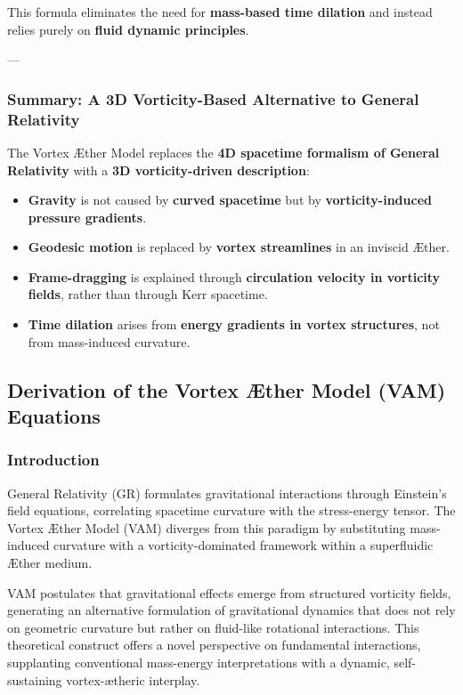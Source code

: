 \documentclass[a4paper,10pt]{article}
\begin{document}
This formula eliminates the need for \textbf{mass-based time dilation} and instead relies purely on \textbf{fluid dynamic principles}.

---

\subsubsection*{Summary: A 3D Vorticity-Based Alternative to General Relativity}

The Vortex Æther Model replaces the \textbf{4D spacetime formalism of General Relativity} with a \textbf{3D vorticity-driven description}:

\begin{itemize}
    \item \textbf{Gravity} is not caused by \textbf{curved spacetime} but by \textbf{vorticity-induced pressure gradients}.
    \item \textbf{Geodesic motion} is replaced by \textbf{vortex streamlines} in an inviscid Æther.
    \item \textbf{Frame-dragging} is explained through \textbf{circulation velocity in vorticity fields}, rather than through Kerr spacetime.
    \item \textbf{Time dilation} arises from \textbf{energy gradients in vortex structures}, not from mass-induced curvature.
\end{itemize}

    \subsection{Derivation of the Vortex Æther Model (VAM) Equations}

\subsubsection*{Introduction}
General Relativity (GR) formulates gravitational interactions through Einstein's field equations, correlating spacetime curvature with the stress-energy tensor. The Vortex Æther Model (VAM) diverges from this paradigm by substituting mass-induced curvature with a vorticity-dominated framework within a superfluidic Æther medium.

VAM postulates that gravitational effects emerge from structured vorticity fields, generating an alternative formulation of gravitational dynamics that does not rely on geometric curvature but rather on fluid-like rotational interactions. This theoretical construct offers a novel perspective on fundamental interactions, supplanting conventional mass-energy interpretations with a dynamic, self-sustaining vortex-ætheric interplay.
\end{document}
